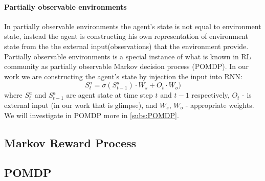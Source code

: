 \paragraph{Partially observable environments}
In partially observable environments the agent's state is not equal to environment state,
instead the agent is constructing his own representation of environment state from
the the external input(observations) that the environment provide.
Partially observable environments is a special instance of what is known in RL community
as partially observable Markov decision process (POMDP). In our work we are constructing
the agent's state by injection the input into RNN:
\begin{equation} \label{eq:rnn_state}
	S_t^a = \sigma(S_{t-1}^a) \cdot W_s + O_t \cdot W_o)
\end{equation}
where $S_t^a$ and $S_{t-1}^a$ are agent state at time step $t$ and $t-1$
respectively, $O_t$ - is external input (in our work that is glimpse),
and $W_s$, $W_o$ - appropriate weights.
We will investigate in POMDP more in \autoref{subs:POMDP}.


\subsection{Markov Reward Process} \label{subs:reward_process}

\subsection{POMDP} \label{subs:POMDP}




%

